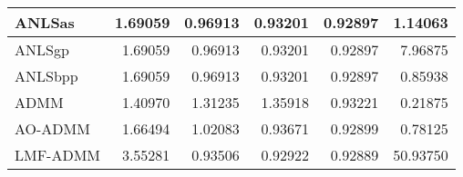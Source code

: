 \documentclass{article}
\begin{document}
\begin{table}[H]
\begin{tabular}{|l|r|r|r|r|r|}
		ANLSas   & 1.69059                  & 0.96913                  & 0.93201                  & 0.92897                  & 1.14063                      \\ \hline
		ANLSgp   & 1.69059                  & 0.96913                  & 0.93201                  & 0.92897                  & 7.96875                      \\ \hline
		ANLSbpp  & 1.69059                  & 0.96913                  & 0.93201                  & 0.92897                  & 0.85938                      \\ \hline
		ADMM     & 1.40970                  & 1.31235                  & 1.35918                  & 0.93221                  & 0.21875                      \\ \hline
		AO-ADMM  & 1.66494                  & 1.02083                  & 0.93671                  & 0.92899                  & 0.78125                      \\ \hline
		LMF-ADMM & 3.55281                  & 0.93506                  & 0.92922                  & 0.92889                  & 50.93750                     \\ \hline
	\end{tabular}
\end{table}
\end{document}
